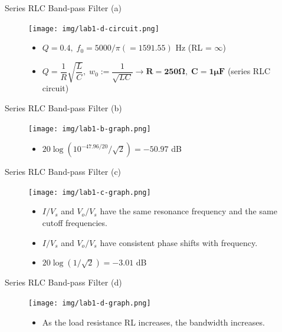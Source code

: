\documentclass[t, 10pt, handout]{beamer}
\begin{document}
\begin{frame}{Series RLC Band-pass Filter (a)}
    \begin{figure}
        \centering
        \texttt{[image: img/lab1-d-circuit.png]}
	\begin{itemize}
		\item $Q = 0.4, \; f_0 = 5000/\pi (= 1591.55)$ Hz   (RL = $\infty$)
		\item $Q = \dfrac{1}{R}\sqrt{\dfrac{L}{C}}, \; w_0 := \dfrac{1}{\sqrt{LC}} \rightarrow \mathbf{R = 250\Omega, \; C = 1\mu F}$ (series RLC circuit)
	\end{itemize}
    \end{figure}
\end{frame}


\begin{frame}{Series RLC Band-pass Filter (b)}
    \begin{figure}
        \centering
        \texttt{[image: img/lab1-b-graph.png]}
	\begin{itemize}
		\item $20\log (10^{-47.96/20}/\sqrt{2}) = -50.97$ dB
	\end{itemize}
    \end{figure}
\end{frame}

\begin{frame}{Series RLC Band-pass Filter (c)}
    \begin{figure}
        \centering
        \texttt{[image: img/lab1-c-graph.png]}
	\begin{itemize}
            \item $I/V_s$ and $V_o/V_s$ have the same resonance frequency and the same cutoff frequencies.
            \item $I/V_s$ and $V_o/V_s$ have consistent phase shifts with frequency.
            \item $20\log (1/\sqrt{2}) = -3.01$ dB
	\end{itemize}
    \end{figure}
\end{frame}

\begin{frame}{Series RLC Band-pass Filter (d)}
    \begin{figure}
        \centering
        \texttt{[image: img/lab1-d-graph.png]}
	\begin{itemize}
		\item As the load resistance RL increases, the bandwidth increases.
	\end{itemize}
    \end{figure}
\end{frame}
\end{document}
